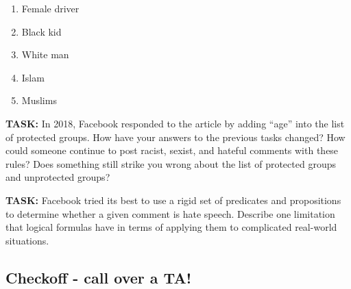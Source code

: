 \documentclass[12pt,letterpaper]{article}
\begin{document}
    \begin{enumerate}[1.]
        \item Female driver
        \item Black kid
        \item White man
        \item Islam
        \item Muslims
    \end{enumerate}
    
    \begin{mdframed} \vspace{3cm} \end{mdframed}
    
     \textbf{TASK:} In 2018, Facebook responded to the article by adding “age” into the list of protected groups. How have your answers to the previous tasks changed? How could someone continue to post racist, sexist, and hateful comments with these rules? Does something still strike you wrong about the list of protected groups and unprotected groups? 
     
     \begin{mdframed} \vspace{3cm} \end{mdframed}
     
     \textbf{TASK:} Facebook tried its best to use a rigid set of predicates and propositions to determine whether a given comment is hate speech. Describe one limitation that logical formulas have in terms of applying them to complicated real-world situations.
     
     \begin{mdframed} \vspace{3cm} \end{mdframed}


\subsection*{Checkoff - call over a TA!}
\end{document}
